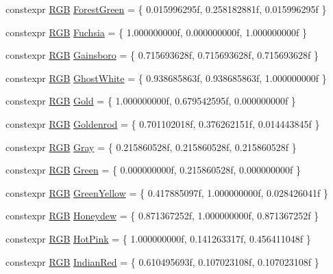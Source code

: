 \begin{DoxyCompactItemize}
\item 
constexpr \hyperlink{structmage_1_1_r_g_b}{R\+GB} \hyperlink{namespacemage_1_1color_a9b90455f4354a6d6963486c472bc33be}{Forest\+Green} = \{ 0.\+015996295f, 0.\+258182881f, 0.\+015996295f \}
\item 
constexpr \hyperlink{structmage_1_1_r_g_b}{R\+GB} \hyperlink{namespacemage_1_1color_a5a36bb041d4344c2111b15294ba0d15f}{Fuchsia} = \{ 1.\+000000000f, 0.\+000000000f, 1.\+000000000f \}
\item 
constexpr \hyperlink{structmage_1_1_r_g_b}{R\+GB} \hyperlink{namespacemage_1_1color_a1caedc498561f07c9ee98360cd32e0cf}{Gainsboro} = \{ 0.\+715693628f, 0.\+715693628f, 0.\+715693628f \}
\item 
constexpr \hyperlink{structmage_1_1_r_g_b}{R\+GB} \hyperlink{namespacemage_1_1color_a6e3a848fd12f965953fa38d355e20ab5}{Ghost\+White} = \{ 0.\+938685863f, 0.\+938685863f, 1.\+000000000f \}
\item 
constexpr \hyperlink{structmage_1_1_r_g_b}{R\+GB} \hyperlink{namespacemage_1_1color_a72d35eacf778a3576ddb3d3c4d8930f0}{Gold} = \{ 1.\+000000000f, 0.\+679542595f, 0.\+000000000f \}
\item 
constexpr \hyperlink{structmage_1_1_r_g_b}{R\+GB} \hyperlink{namespacemage_1_1color_aebd4f6050ceb4c380fc13cc7d3302888}{Goldenrod} = \{ 0.\+701102018f, 0.\+376262151f, 0.\+014443845f \}
\item 
constexpr \hyperlink{structmage_1_1_r_g_b}{R\+GB} \hyperlink{namespacemage_1_1color_a43f3c4cf9713fb15ed89dec2c9d26556}{Gray} = \{ 0.\+215860528f, 0.\+215860528f, 0.\+215860528f \}
\item 
constexpr \hyperlink{structmage_1_1_r_g_b}{R\+GB} \hyperlink{namespacemage_1_1color_a063b467cc0e16aa4a291c38307a21bc0}{Green} = \{ 0.\+000000000f, 0.\+215860528f, 0.\+000000000f \}
\item 
constexpr \hyperlink{structmage_1_1_r_g_b}{R\+GB} \hyperlink{namespacemage_1_1color_a28c20da179750abce432ec6439426338}{Green\+Yellow} = \{ 0.\+417885097f, 1.\+000000000f, 0.\+028426041f \}
\item 
constexpr \hyperlink{structmage_1_1_r_g_b}{R\+GB} \hyperlink{namespacemage_1_1color_a6fdd1089a1f0d6a77b9b6298907e3361}{Honeydew} = \{ 0.\+871367252f, 1.\+000000000f, 0.\+871367252f \}
\item 
constexpr \hyperlink{structmage_1_1_r_g_b}{R\+GB} \hyperlink{namespacemage_1_1color_a64c422466ccc5c44c1c4a0e6f435a3c3}{Hot\+Pink} = \{ 1.\+000000000f, 0.\+141263317f, 0.\+456411048f \}
\item 
constexpr \hyperlink{structmage_1_1_r_g_b}{R\+GB} \hyperlink{namespacemage_1_1color_ac72ec1deca799c7ea8a266178fcff437}{Indian\+Red} = \{ 0.\+610495693f, 0.\+107023108f, 0.\+107023108f \}

\end{DoxyCompactItemize}
